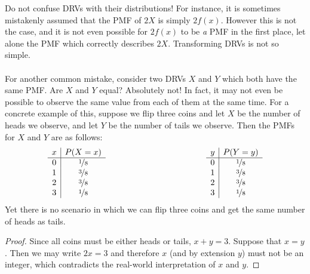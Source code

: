 \documentclass{report}
\begin{document}
\begin{notsofast}
    Do not confuse DRVs with their distributions! For instance, it is sometimes mistakenly assumed that the PMF of $2X$ is simply $2f(x)$. However this is not the case, and it is not even possible for $2f(x)$ to be \emph a PMF in the first place, let alone the PMF which correctly describes $2X$. Transforming DRVs is not so simple.
    \\\\
    For another common mistake, consider two DRVs $X$ and $Y$ which both have the same PMF. Are $X$ and $Y$ equal? Absolutely not! In fact, it may not even be possible to observe the same value from each of them at the same time. For a concrete example of this, suppose we flip three coins and let $X$ be the number of heads we observe, and let $Y$ be the number of tails we observe. Then the PMFs for $X$ and $Y$ are as follows:
    \[
        \begin{array}{ccc}
            \begin{array}{c|c}
                x & P(X=x) \\
                \hline
                0 & \nicefrac 18 \\
                1 & \nicefrac 38 \\
                2 & \nicefrac 38 \\
                3 & \nicefrac 18
            \end{array}
            & \hspace{100px} &
            \begin{array}{c|c}
                y & P(Y=y) \\
                \hline
                0 & \nicefrac 18 \\
                1 & \nicefrac 38 \\
                2 & \nicefrac 38 \\
                3 & \nicefrac 18
            \end{array}
        \end{array}
    \]
    Yet there is no scenario in which we can flip three coins and get the same number of heads as tails.
    \begin{proof}
        Since all coins must be either heads or tails, $x+y=3$. Suppose that $x=y$. Then we may write $2x=3$ and therefore $x$ (and by extension $y$) must not be an integer, which contradicts the real-world interpretation of $x$ and $y$.
    \end{proof}
\end{notsofast}
\end{document}
